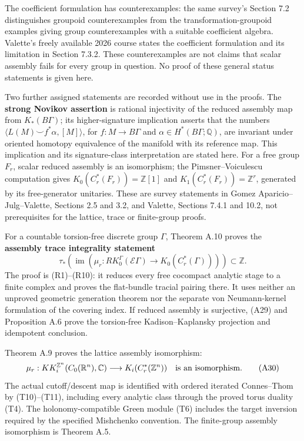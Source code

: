 \documentclass[
  11pt,
]{article}
\begin{document}
The coefficient formulation has counterexamples: the same survey's
Section 7.2 distinguishes groupoid counterexamples from the
transformation-groupoid examples giving group counterexamples with a
suitable coefficient algebra. Valette's freely available 2026 course
states the coefficient formulation and its limitation in Section 7.3.2.
These counterexamples are not claims that scalar assembly fails for
every group in question. No proof of these general status statements is
given here.

Two further assigned statements are recorded without use in the proofs.
The \textbf{strong Novikov assertion} is rational injectivity of the
reduced assembly map from \(K_*(B\Gamma)\); its higher-signature
implication asserts that the numbers
\(\langle L(M)\smile f^*\alpha,[M]\rangle\), for \(f:M\to B\Gamma\) and
\(\alpha\in H^*(B\Gamma;\mathbb Q)\), are invariant under oriented
homotopy equivalence of the manifold with its reference map. This
implication and its signature-class interpretation are stated here. For
a free group \(F_r\), scalar reduced assembly is an isomorphism; the
Pimsner--Voiculescu computation gives \(K_0(C_r^*(F_r))=\mathbb Z[1]\)
and \(K_1(C_r^*(F_r))=\mathbb Z^r\), generated by its free-generator
unitaries. These are survey statements in Gomez Aparicio--Julg--Valette,
Sections 2.5 and 3.2, and Valette, Sections 7.4.1 and 10.2, not
prerequisites for the lattice, trace or finite-group proofs.

For a countable torsion-free discrete group \(\Gamma\), Theorem A.10
proves the \textbf{assembly trace integrality statement} \[
\tau_*\!\left(\operatorname{im}
 \left(\mu_r:RK_0^\Gamma(\mathcal E\Gamma)\to
                         K_0(C_r^*(\Gamma))\right)\right)
 \subset\mathbb Z.
\tag{A29}
\] The proof is (R1)--(R10): it reduces every free cocompact analytic
stage to a finite complex and proves the flat-bundle tracial pairing
there. It uses neither an unproved geometric generation theorem nor the
separate von Neumann-kernel formulation of the covering index. If
reduced assembly is surjective, (A29) and Proposition A.6 prove the
torsion-free Kadison--Kaplansky projection and idempotent conclusion.

Theorem A.9 proves the lattice assembly isomorphism: \[
\mu_r:KK_i^{\mathbb Z^n}(C_0(\mathbb R^n),\mathbb C)
       \longrightarrow K_i(C_r^*(\mathbb Z^n))
\quad\hbox{is an isomorphism.}
\tag{A30}
\] The actual cutoff/descent map is identified with ordered iterated
Connes--Thom by (T10)--(T11), including every analytic class through the
proved torus duality (T4). The holonomy-compatible Green module (T6)
includes the target inversion required by the specified Mishchenko
convention. The finite-group assembly isomorphism is Theorem A.5.
\end{document}
